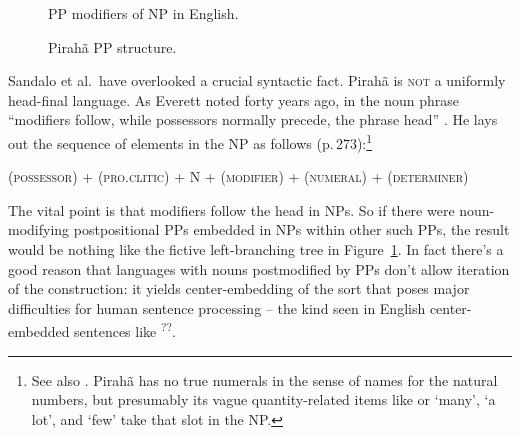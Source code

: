 \documentclass[output=paper,colorlinks,citecolor=brown
]{langscibook}
\begin{document}
\begin{figure}
\begin{floatrow}
\ffigbox[.39\textwidth]{%
\resizebox{.39\textwidth}{!}{%
\begin{forest}
[NP [N [coin] ] 
    [PP [P [on] ] 
        [NP [N [paper] ]
            [PP [P [on] ] 
                [NP [N [chair] ]
                    [PP [P [on] ] 
                    [NP [N [board] ] ] ] ] ] ] ] ]
\end{forest}}}
{\caption{PP modifiers of NP in English.}\label{fig:pullum:1a}}
\ffigbox[.58\textwidth]{%
\resizebox{.58\textwidth}{!}{%
\begin{forest}
[NP [PP [NP [PP [NP [PP [NP 
     [N [tabo\\board] ] ] [P [apo\\on] ] ]
     [N [tiapapati\\chair] ] ] [P [apo\\on] ] ]
     [N [kapiiga\\paper] ] ] [P [apo\\on] ] ]
     [N [gigohoi\\coin] ] ]
\end{forest}}}
{\caption{ Pirahã PP structure.}\label{fig:pullum:1b}}
\end{floatrow}
\end{figure}

\largerpage
Sandalo et al.\ have overlooked a crucial syntactic fact. Pirah{\~a} is
\textsc{not} a uniformly head-final language. As Everett noted forty
years ago, in the noun phrase ``modifiers follow, while possessors normally
precede, the phrase head'' \citep[272]{Everett86HAL}. He lays out
the sequence of elements in the NP as follows
(p.\,273):{\footnote{\label{nonumerals}%
   See also \citet[132ff]{Everett83}. Pirah{\~a} has no true
   numerals in the sense of names for the natural numbers, but presumably
   its vague quantity-related items like  or
    `many',
    `a lot', and
    `few' take that slot in the NP.}}

\ea
(\textsc{possessor}) + (\textsc{pro.clitic}) + N + (\textsc{modifier})
+ (\textsc{numeral}) + (\textsc{determiner})
\z

The vital point is that modifiers follow the head in NPs. So if there
were noun-modifying postpositional PPs embedded in NPs within other
such PPs, the result would be nothing like the fictive left-branching
tree in Figure~\ref{fig:pullum:1b}. In fact there's a good reason that languages with nouns
postmodified by PPs don't allow iteration of the construction: it
yields center-embedding of the sort that poses major difficulties for
human sentence processing -- the kind seen in English center-embedded
sentences like \textsuperscript{??}.
\end{document}
